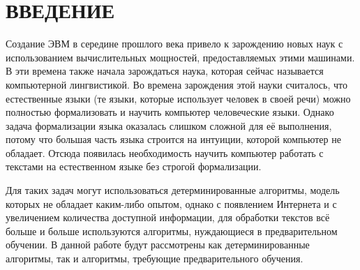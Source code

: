 \chapter*{ВВЕДЕНИЕ}

Создание ЭВМ в середине прошлого века привело к зарождению новых наук с использованием вычислительных мощностей, предоставляемых этими машинами. В эти времена также начала зарождаться наука, которая сейчас называется компьютерной лингвистикой. Во времена зарождения этой науки считалось, что естественные языки (те языки, которые использует человек в своей речи) можно полностью формализовать и научить компьютер  человеческие языки. Однако задача формализации языка оказалась слишком сложной для её выполнения, потому что большая часть языка строится на интуиции, которой компьютер не обладает. Отсюда появилась необходимость научить компьютер работать с текстами на естественном языке без строгой формализации.

Для таких задач могут использоваться детерминированные алгоритмы, модель которых не обладает каким-либо опытом, однако с появлением Интернета и с увеличением количества доступной информации, для обработки текстов всё больше и больше используются алгоритмы, нуждающиеся в предварительном обучении. В данной работе будут рассмотрены как детерминированные алгоритмы, так и алгоритмы, требующие предварительного обучения.
\newpage
